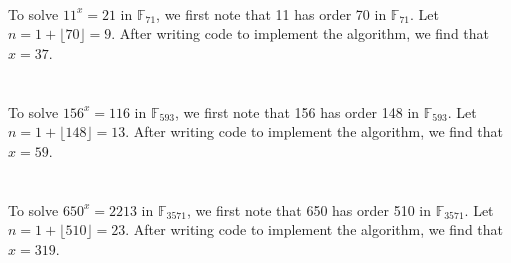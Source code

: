 \documentclass[
  coursecode={MTHE 418},
  assignmentname={Homework \homeworknumber},
  studentnumber=20053722,
  name={Bryan Hoang},
  draft,
]{
  ltxanswer%
}
\date{2022-02-28}
\begin{document}
  \begin{questions}
    \setcounter{question}{\questionnumber}
    \addtocounter{question}{-1}
    \question[10]\
    \begin{parts}
      \part{}
      \begin{solution}
        To solve \(11^{x} = 21\) in \(\mathbb{F}_{71}\), we first note that 11 has order 70 in \(\mathbb{F}_{71}\). Let \(n = 1 + \lfloor 70 \rfloor = 9\). After writing code to implement the algorithm, we find that \(\boxed{x = 37}\).
      \end{solution}

      \part{}
      \begin{solution}
        To solve \(156^{x} = 116\) in \(\mathbb{F}_{593}\), we first note that 156 has order 148 in \(\mathbb{F}_{593}\). Let \(n = 1 + \lfloor 148 \rfloor = 13\). After writing code to implement the algorithm, we find that \(\boxed{x = 59}\).
      \end{solution}

      \part{}
      \begin{solution}
        To solve \(650^{x} = 2213\) in \(\mathbb{F}_{3571}\), we first note that 650 has order 510 in \(\mathbb{F}_{3571}\). Let \(n = 1 + \lfloor 510 \rfloor = 23\). After writing code to implement the algorithm, we find that \(\boxed{x = 319}\).
      \end{solution}
    \end{parts}
  \end{questions}
\end{document}

